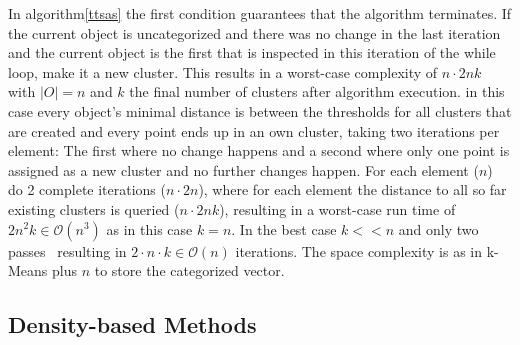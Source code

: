 In algorithm\ref{ttsas} the first condition guarantees that the algorithm terminates. If the current object is uncategorized and there was no change in the last iteration and the current object is the first that is inspected in this iteration of the while loop, make it a new cluster. This results in a worst-case complexity of $n \cdot 2nk$ with $|O| = n$ and $k$ the final number of clusters after algorithm execution. in this case every object's minimal distance is between the thresholds for all clusters that are created and every point ends up in an own cluster, taking two iterations per element: The first where no change happens and a second where only one point is assigned as a new cluster and no further changes happen. For each element ($n$) do 2 complete iterations ($n \cdot 2n$), where for each element the distance to all so far existing clusters is queried ($n \cdot 2nk$), resulting in a worst-case run time of $2n^2k \in \mathcal{O}(n^3)$ as in this case $k = n$. In the best case $k << n$ and only two passes~\cite{THEODORIDIS2009627} resulting in $2 \cdot n \cdot k \in \mathcal{O}(n)$ iterations. The space complexity is as in k-Means plus $n$ to store the categorized vector.

\subsection{Density-based Methods}\label{\positionnumber}
